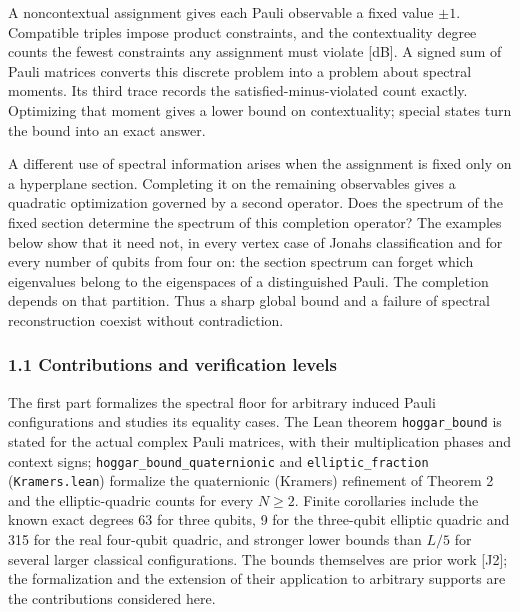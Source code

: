 \documentclass[11pt,a4paper]{article}
\begin{document}
A noncontextual assignment gives each Pauli observable a fixed value \(\pm1\). Compatible triples
impose product constraints, and the contextuality degree counts the fewest constraints any assignment
must violate {[}dB{]}. A signed sum of Pauli matrices converts this discrete problem into a problem about
spectral moments. Its third trace records the satisfied-minus-violated count exactly. Optimizing that
moment gives a lower bound on contextuality; special states turn the bound into an exact answer.

A different use of spectral information arises when the assignment is fixed only on a hyperplane
section. Completing it on the remaining observables gives a quadratic optimization governed by a
second operator. Does the spectrum of the fixed section determine the spectrum of this completion
operator? The examples below show that it need not, in every vertex case of Jonah\textquotesingle s classification
and for every number of qubits from four on: the section spectrum can forget which eigenvalues belong
to the eigenspaces of a distinguished Pauli. The completion depends on that partition. Thus a sharp
global bound and a failure of spectral reconstruction coexist without contradiction.

\subsubsection{1.1 Contributions and verification levels}\label{11-contributions-and-verification-levels}

The first part formalizes the spectral floor for arbitrary induced Pauli configurations and studies
its equality cases. The Lean theorem \texttt{hoggar\_bound} is stated for the actual complex Pauli matrices,
with their multiplication phases and context signs; \nolinkurl{hoggar_bound_quaternionic} and \texttt{elliptic\_fraction}
(\texttt{Kramers.lean}) formalize the quaternionic (Kramers) refinement of Theorem 2 and the elliptic-quadric
counts for every \(N\ge2\). Finite corollaries include the known exact degrees 63 for three qubits, 9 for
the three-qubit elliptic quadric and 315 for the real four-qubit quadric, and stronger lower bounds than
\(L/5\) for several larger classical configurations. The bounds themselves are prior work {[}J2{]}; the
formalization and the extension of their application to arbitrary supports are the contributions
considered here.
\end{document}
